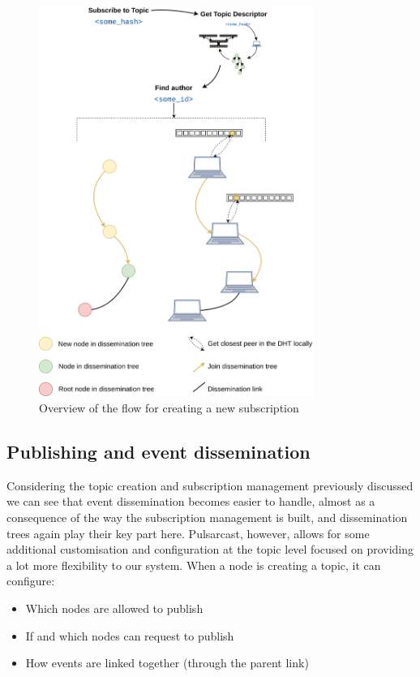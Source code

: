 \begin{figure}[hb!]
  \centering
  \includegraphics[width=0.8\textwidth]{img/pulsarcast-subscription-flow.png}
  \caption{Overview of the flow for creating a new subscription}
  \label{fig:pulsarcast-subscription-flow}
\end{figure}

\subsection{Publishing and event dissemination}\label{subsec:publishing-and-event-dissemination}

Considering the topic creation and subscription management previously discussed
we can see that event dissemination becomes easier to handle, almost as a
consequence of the way the subscription management is built, and dissemination
trees again play their key part here. Pulsarcast, however, allows for some
additional customisation and configuration at the topic level focused on
providing a lot more flexibility to our system. When a node is creating a
topic, it can configure:
\begin{itemize}
  \item
    Which nodes are allowed to publish
  \item
     If and which nodes can request to publish
  \item
    How events are linked together (through the parent link)
\end{itemize}

